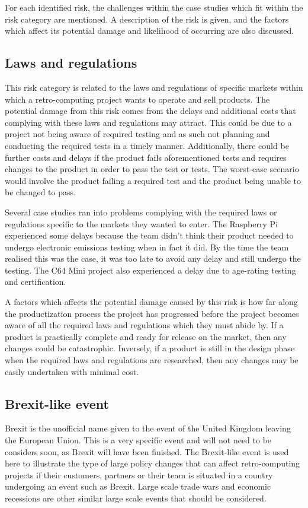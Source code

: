 For each identified risk, the challenges within the case studies which fit within the risk category are mentioned. A description of the risk is given, and the factors which affect its potential damage and likelihood of occurring are also discussed.


\subsection{Laws and regulations}
This risk category is related to the laws and regulations of specific markets within which a retro-computing project wants to operate and sell products. The potential damage from this risk comes from the delays and additional costs that complying with these laws and regulations may attract. This could be due to a project not being aware of required testing and as such not planning and conducting the required tests in a timely manner. Additionally, there could be further costs and delays if the product fails aforementioned tests and requires changes to the product in order to pass the test or tests. The worst-case scenario would involve the product failing a required test and the product being unable to be changed to pass. 

Several case studies ran into problems complying with the required laws or regulations specific to the markets they wanted to enter. The Raspberry Pi experienced some delays because the team didn't think their product needed to undergo electronic emissions testing when in fact it did. By the time the team realised this was the case, it was too late to avoid any delay and still undergo the testing. The C64 Mini project also experienced a delay due to age-rating testing and certification.  

A factors which affects the potential damage caused by this risk is how far along the productization process the project has progressed before the project becomes aware of all the required laws and regulations which they must abide by. If a product is practically complete and ready for release on the market, then any changes could be catastrophic. Inversely, if a product is still in the design phase when the required laws and regulations are researched, then any changes may be easily undertaken with minimal cost.

\subsection{Brexit-like event}
Brexit is the unofficial name given to the event of the United Kingdom leaving the European Union. This is a very specific event and will not need to be considers soon, as Brexit will have been finished. The Brexit-like event is used here to illustrate the type of large policy changes that can affect retro-computing projects if their customers, partners or their team is situated in a country undergoing an event such as Brexit. Large scale trade wars and economic recessions are other similar large scale events that should be considered. 

